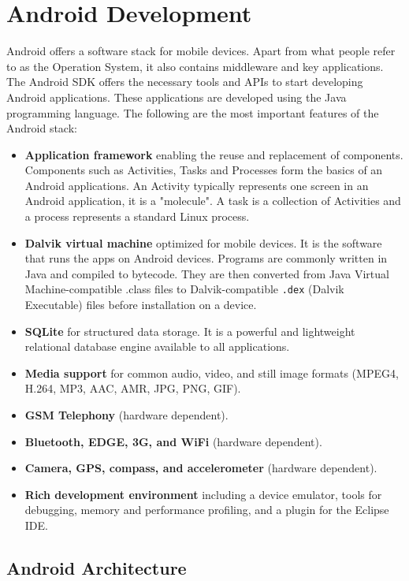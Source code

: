 \chapter{Android Development}

Android offers a software stack for mobile devices. Apart from what people refer to as the Operation System, it also contains middleware and key applications. The Android SDK offers the necessary tools and APIs to start developing Android applications. These applications are developed using the Java programming language. The following are the most important features of the Android stack:

\begin{itemize}
\item{\textbf{Application framework} enabling the reuse and replacement of components. Components such as Activities, Tasks and Processes form the basics of an Android applications. An Activity typically represents one screen in an Android application, it is a "molecule". A task is a collection of Activities and a process represents a standard Linux process.}
\item{\textbf{Dalvik virtual machine} optimized for mobile devices. It is the software that runs the apps on Android devices. Programs are commonly written in Java and compiled to bytecode. They are then converted from Java Virtual Machine-compatible .class files to Dalvik-compatible \texttt{.dex} (Dalvik Executable) files before installation on a device.}
\item{\textbf{SQLite} for structured data storage. It is a powerful and lightweight relational database engine available to all applications.}
\item{\textbf{Media support} for common audio, video, and still image formats (MPEG4, H.264, MP3, AAC, AMR, JPG, PNG, GIF).}
\item{\textbf{GSM Telephony} (hardware dependent).}
\item{\textbf{Bluetooth, EDGE, 3G, and WiFi} (hardware dependent).}
\item{\textbf{Camera, GPS, compass, and accelerometer} (hardware dependent).}
\item{\textbf{Rich development environment} including a device emulator, tools for debugging, memory and performance profiling, and a plugin for the Eclipse IDE.}
\end{itemize}

\section{Android Architecture}

